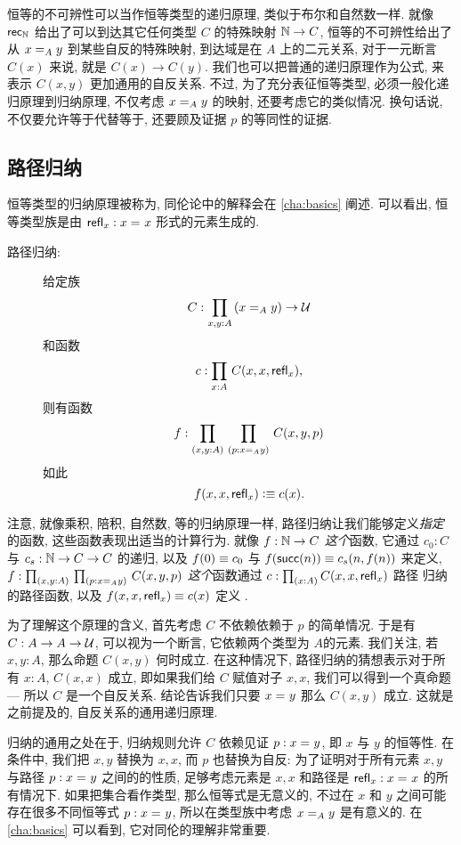 恒等的不可辨性可以当作恒等类型的递归原理, 类似于布尔和自然数一样. 就像 $\rec{\nat}$ 给出了可以到达其它任何类型 $C$ 的特殊映射 $\nat\to C$, 恒等的不可辨性给出了从 $\id[A] x y$ 到某些自反的特殊映射, 到达域是在 $A$ 上的二元关系, 对于一元断言 $C(x)$ 来说, 就是 $C(x) \to C(y)$. 我们也可以把普通的递归原理作为公式, 来表示 $C(x,y)$ 更加通用的自反关系. 不过, 为了充分表征恒等类型, 必须一般化递归原理到归纳原理, 不仅考虑 $\id[A] x y$ 的映射, 还要考虑它的类似情况. 换句话说, 不仅要允许等于代替等于, 还要顾及证据 $p$ 的等同性的证据. 

\subsection{路径归纳}

恒等类型的归纳原理被称为, %
%
同伦论中的解释会在 \cref{cha:basics} 阐述. 可以看出, 恒等类型族是由 $\refl{x}: \id{x}{x}$ 形式的元素生成的. 

\begin{description}
\item[路径归纳:] 
给定族 
\[ C : \prd{x,y:A} (\id[A]{x}{y}) \to \UU \]
和函数
\[ c : \prd{x:A} C(x,x,\refl{x}),\]
则有函数
\[ f : \prd{x,y:A}{p:\id[A]{x}{y}} C(x,y,p) \]
如此 
\[ f(x,x,\refl{x}) \defeq c(x). \]
\end{description}

注意, 就像乘积, 陪积, 自然数, 等的归纳原理一样, 路径归纳让我们能够定义\emph{指定}的函数, 这些函数表现出适当的计算行为. 就像 $f:\nat\to C$ \emph{这个}函数, 它通过 $c_0:C$ 与 $c_s:\nat \to C \to C$ 的递归, 以及 $f(0)\jdeq c_0$ 与 $f(\suc(n))\jdeq c_s(n,f(n))$ 来定义, $f : \dprd{x,y:A}{p:\id[A]{x}{y}} C(x,y,p)$ \emph{这个}函数通过 $c : \prd{x:A} C(x,x,\refl{x})$ 路径 归纳的路径函数, 以及 $f(x,x,\refl{x}) \jdeq c(x)$ 定义 . 

为了理解这个原理的含义, 首先考虑 $C$ 不依赖依赖于 $p$ 的简单情况. 于是有 $C:A\to A\to \UU$, 可以视为一个断言, 它依赖两个类型为 $A$的元素. 我们关注, 若 $x,y:A$, 那么命题 $C(x,y)$ 何时成立. 在这种情况下, 路径归纳的猜想表示对于所有 $x:A$, $C(x,x)$ 成立, 即如果我们给 $C$ 赋值对子 $x, x$, 我们可以得到一个真命题 --- 所以 $C$ 是一个自反关系. 结论告诉我们只要 $\id{x}{y}$ 那么 $C(x,y)$ 成立. 这就是之前提及的, 自反关系的通用递归原理. 

归纳的通用之处在于, 归纳规则允许 $C$ 依赖见证 $p:\id{x}{y}$, 即 $x$ 与 $y$ 的恒等性. 在条件中, 我们把 $x, y$ 替换为 $x,x$, 而 $p$ 也替换为自反: 为了证明对于所有元素 $x,y$ 与路径 $p : \id{x}{y}$ 之间的的性质, 足够考虑元素是 $x,x$ 和路径是 $\refl{x}: \id{x}{x}$ 的所有情况下. 如果把集合看作类型, 那么恒等式是无意义的, 不过在 $x$ 和 $y$ 之间可能存在很多不同恒等式 $p : \id{x}{y}$, 所以在类型族中考虑 $\id[A]{x}{y}$ 是有意义的. 在 \cref{cha:basics} 可以看到, 它对同伦的理解非常重要. 

